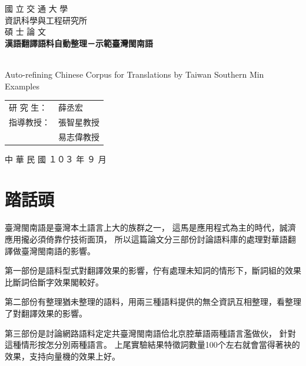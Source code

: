 \documentclass[final,oneside,onecolumn,12pt,a4paper]{book}%
\begin{document}
\begin{titlepage}

\begin{center}

   

\textsc{\Huge 國 立 交 通 大 學} %
\\[2em]
\textsc{\LARGE 資訊科學與工程研究所} %
\\[2em]
\textsc{\LARGE 碩 士 論 文} %
\\[3em]

{\huge \bfseries 漢語翻譯語料自動整理－示範臺灣閩南語 } %

\\[1em]
{\LARGE Auto-refining Chinese Corpus for Translations by Taiwan Southern Min Examples}
\\[3em]

\begin{table}[H]
\centering
\Large
\begin{tabular}{ll}
研 究 生： & 薛丞宏\\ %
指導教授： & 張智星教授\\ %
 & 易志偉教授\\ %
\end{tabular}
\end{table}

\vfill

{\large 中 華 民 國  １０３  年  ９  月}

\end{center}

\end{titlepage}


\frontmatter
\chapter{踏話頭}
臺灣閩南語是臺灣本土語言上大的族群之一，
這馬是應用程式為主的時代，誠濟應用攏必須倚靠佇技術面頂，
所以這篇論文分三部份討論語料庫的處理對華語翻譯做臺灣閩南語的影響。

第一部份是語料型式對翻譯效果的影響，佇有處理未知詞的情形下，斷詞組的效果比斷詞佮斷字效果閣較好。

第二部份有整理猶未整理的語料，用兩三種語料提供的無仝資訊互相整理，看整理了對翻譯效果的影響。

第三部份是討論網路語料定定共臺灣閩南語佮北京腔華語兩種語言濫做伙，
針對這種情形按怎分別兩種語言。
上尾實驗結果特徵詞數量100个左右就會當得著袂的效果，支持向量機的效果上好。
\end{document}
